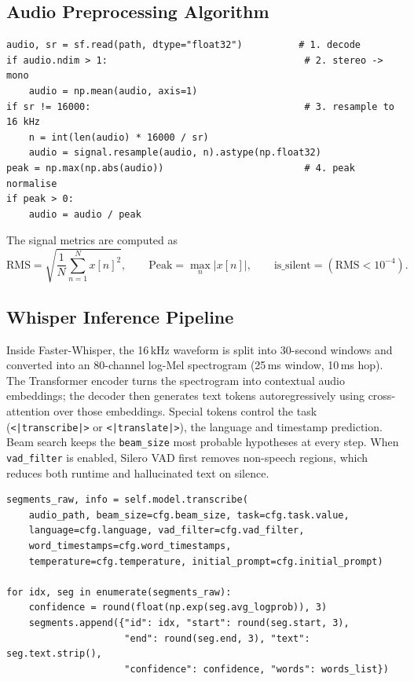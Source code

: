 \documentclass[11pt,a4paper]{article}
\begin{document}
\subsection{Audio Preprocessing Algorithm}
\begin{lstlisting}[style=py]
audio, sr = sf.read(path, dtype="float32")          # 1. decode
if audio.ndim > 1:                                   # 2. stereo -> mono
    audio = np.mean(audio, axis=1)
if sr != 16000:                                      # 3. resample to 16 kHz
    n = int(len(audio) * 16000 / sr)
    audio = signal.resample(audio, n).astype(np.float32)
peak = np.max(np.abs(audio))                         # 4. peak normalise
if peak > 0:
    audio = audio / peak
\end{lstlisting}

The signal metrics are computed as
\[
\text{RMS} = \sqrt{\frac{1}{N}\sum_{n=1}^{N} x[n]^2}, \qquad
\text{Peak} = \max_n |x[n]|, \qquad
\text{is\_silent} = (\text{RMS} < 10^{-4}).
\]

\subsection{Whisper Inference Pipeline}
Inside Faster-Whisper, the 16\,kHz waveform is split into 30-second windows and converted into an 80-channel log-Mel spectrogram (25\,ms window, 10\,ms hop). The Transformer encoder turns the spectrogram into contextual audio embeddings; the decoder then generates text tokens autoregressively using cross-attention over those embeddings. Special tokens control the task (\texttt{<|transcribe|>} or \texttt{<|translate|>}), the language and timestamp prediction. Beam search keeps the \texttt{beam\_size} most probable hypotheses at every step. When \texttt{vad\_filter} is enabled, Silero VAD first removes non-speech regions, which reduces both runtime and hallucinated text on silence.

\begin{lstlisting}[style=py]
segments_raw, info = self.model.transcribe(
    audio_path, beam_size=cfg.beam_size, task=cfg.task.value,
    language=cfg.language, vad_filter=cfg.vad_filter,
    word_timestamps=cfg.word_timestamps,
    temperature=cfg.temperature, initial_prompt=cfg.initial_prompt)

for idx, seg in enumerate(segments_raw):
    confidence = round(float(np.exp(seg.avg_logprob)), 3)
    segments.append({"id": idx, "start": round(seg.start, 3),
                     "end": round(seg.end, 3), "text": seg.text.strip(),
                     "confidence": confidence, "words": words_list})
\end{lstlisting}
\end{document}
